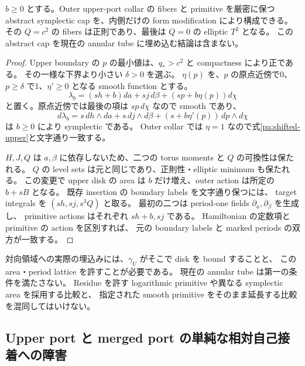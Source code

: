 \begin{proposition}\label{pa:modified-cap}
$b\ge0$ とする。Outer upper-port collar の fibers と primitive を厳密に保つ
abstract symplectic cap を、内側だけの form modification により構成できる。
その $Q=c^2$ の fibers は正則であり、最後は $Q=0$ の elliptic $T^2$ となる。
この abstract cap を現在の annular tube に埋め込む結論は含まない。
\end{proposition}

\begin{proof}
Upper boundary の $p$ の最小値は、$q_*>c^2$ と compactness により正である。
その一様な下界より小さい $\delta>0$ を選ぶ。
$\eta(p)$ を、$p$ の原点近傍で0、$p\ge\delta$ で1、$\eta'\ge0$ となる smooth function とする。
\begin{equation}\label{pa:cap-primitive}
 \lambda_b=(sh+b)da+sj\,d\beta+(sp+b\eta(p))d\chi
\end{equation}
と置く。原点近傍では最後の項は $sp\,d\chi$ なので smooth であり、
\[
 d\lambda_b=s\,dh\wedge da+s\,dj\wedge d\beta
              +(s+b\eta'(p))\,dp\wedge d\chi
\]
は $b\ge0$ により symplectic である。
Outer collar では $\eta=1$ なので式\eqref{pa:shifted-upper}と文字通り一致する。

$H,J,Q$ は $a,\beta$ に依存しないため、二つの torus moments と $Q$ の可換性は保たれる。
$Q$ の level sets は元と同じであり、正則性・elliptic minimum も保たれる。
この変更で upper disk の area は $b$ だけ増え、outer action は所定の $b+sB$ となる。
既存 insertion の boundary labels を文字通り保つには、
target integrals を $(sh,sj,s^3Q)$ と取る。
最初の二つは period-one fields $\partial_a,\partial_\beta$ を生成し、
primitive actions はそれぞれ $sh+b,sj$ である。
Hamiltonian の定数項と primitive の action を区別すれば、
元の boundary labels と marked periods の双方が一致する。
\end{proof}

対向領域への実際の埋込みには、$\gamma_U$ がそこで disk を bound することと、
この area・period lattice を許すことが必要である。
現在の annular tube は第一の条件を満たさない。
Residue を許す logarithmic primitive や異なる symplectic area を採用する比較と、
指定された smooth primitive をそのまま延長する比較を混同してはいけない。

\subsection{Upper port と merged port の単純な相対自己接着への障害}

